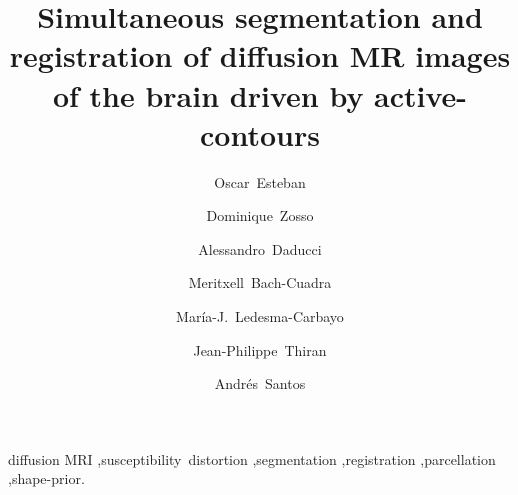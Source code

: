\documentclass[5p,authoryear]{elsarticle}
\begin{document}
\begin{frontmatter}


\title{Simultaneous segmentation and registration of diffusion MR images of the brain driven
by active-contours}

\author[bit]{Oscar~Esteban}
\author[ucla]{Dominique~Zosso}
\author[lts5]{Alessandro~Daducci}
\author[chuv,lts5]{Meritxell~Bach-Cuadra}
\author[bit]{Mar\'ia-J.~Ledesma-Carbayo}
\author[lts5]{Jean-Philippe~Thiran}
\author[bit]{Andr\'es~Santos}


\address[bit]{Biomedical Image Technologies (BIT), ETSI Telecomunicaci\'on, %
Universidad Polit\'ecnica de Madrid and CIBER-BBN, Madrid, Spain}
\address[ucla]{Department of Mathematics, University of California,
Los Angeles (UCLA), Los Angeles, CA, US}
\address[lts5]{Signal Processing Laboratory (LTS5), \'Ecole Polytechnique
F\'ed\'erale de Lausanne (EPFL), Lausanne, Switzerland}
\address[chuv]{Dept. of Radiology, University
Hospital Center (CHUV) and University of Lausanne (UNIL), Lausanne, Switzerland}

\begin{abstract}

\end{abstract}

\begin{keyword}
diffusion MRI \sep susceptibility~distortion \sep segmentation %
\sep registration \sep parcellation \sep shape-prior.
\end{keyword}

\end{frontmatter}

\linenumbers










%



\appendix

\end{document}
